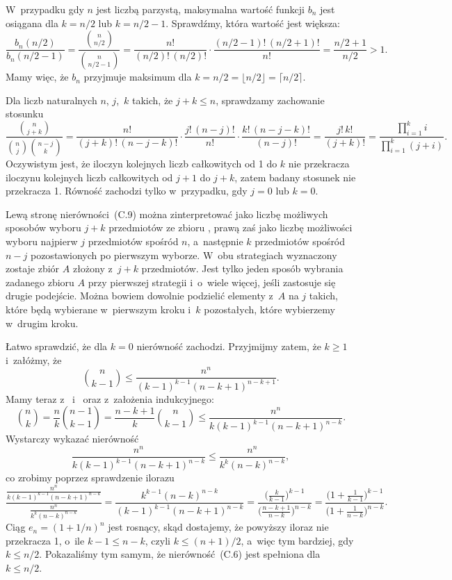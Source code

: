 W~przypadku gdy $n$ jest liczbą parzystą, maksymalna wartość funkcji $b_n$ jest osiągana dla $k=n/2$ lub $k=n/2-1$. Sprawdźmy, która wartość jest większa:
\[
    \frac{b_n(n/2)}{b_n(n/2-1)} = \frac{\binom{n}{n/2}}{\binom{n}{n/2-1}} = \frac{n!}{(n/2)!\,(n/2)!}\cdot\frac{(n/2-1)!\,(n/2+1)!}{n!} = \frac{n/2+1}{n/2} > 1.
\]
Mamy więc, że $b_n$ przyjmuje maksimum dla $k=n/2=\lfloor n/2\rfloor=\lceil n/2\rceil$.

\exercise %
Dla liczb naturalnych $n$, $j$,~$k$ takich, że $j+k\le n$, sprawdzamy zachowanie stosunku
\[
	\frac{\binom{n}{j+k}}{\binom{n}{j}\binom{n-j}{k}} = \frac{n!}{(j+k)!\,(n-j-k)!}\cdot\frac{j!\,(n-j)!}{n!}\cdot\frac{k!\,(n-j-k)!}{(n-j)!} = \frac{j!\,k!}{(j+k)!} = \frac{\prod_{i=1}^ki}{\prod_{i=1}^k(j+i)}.
\]
Oczywistym jest, że iloczyn kolejnych liczb całkowitych od 1 do $k$ nie przekracza iloczynu kolejnych liczb całkowitych od $j+1$ do $j+k$, zatem badany stosunek nie przekracza 1. Równość zachodzi tylko w~przypadku, gdy $j=0$ lub $k=0$.

Lewą stronę nierówności~(C.9) można zinterpretować jako liczbę możliwych sposobów wyboru $j+k$ przedmiotów ze zbioru , prawą zaś jako liczbę możliwości wyboru najpierw $j$ przedmiotów spośród $n$, a~następnie $k$ przedmiotów spośród $n-j$ pozostawionych po pierwszym wyborze. W~obu strategiach wyznaczony zostaje zbiór $A$ złożony z~$j+k$ przedmiotów. Jest tylko jeden sposób wybrania zadanego zbioru $A$ przy pierwszej strategii i~o~wiele więcej, jeśli zastosuje się drugie podejście. Można bowiem dowolnie podzielić elementy z~$A$ na $j$ takich, które będą wybierane w~pierwszym kroku i~$k$ pozostałych, które wybierzemy w~drugim kroku.

\exercise %
Łatwo sprawdzić, że dla $k=0$ nierówność zachodzi. Przyjmijmy zatem, że $k\ge1$ i~załóżmy, że
\[
	\binom{n}{k-1} \le \frac{n^n}{(k-1)^{k-1}(n-k+1)^{n-k+1}}.
\]
Mamy teraz z~ i~ oraz z~założenia indukcyjnego:
\[
	\binom{n}{k} = \frac{n}{k}\binom{n-1}{k-1} = \frac{n-k+1}{k}\binom{n}{k-1} \le \frac{n^n}{k(k-1)^{k-1}(n-k+1)^{n-k}}.
\]
Wystarczy wykazać nierówność
\[
	\frac{n^n}{k(k-1)^{k-1}(n-k+1)^{n-k}} \le \frac{n^n}{k^k(n-k)^{n-k}},
\]
co zrobimy poprzez sprawdzenie ilorazu
\[
	\frac{\frac{n^n}{k(k-1)^{k-1}(n-k+1)^{n-k}}}{\frac{n^n}{k^k(n-k)^{n-k}}} = \frac{k^{k-1}(n-k)^{n-k}}{(k-1)^{k-1}(n-k+1)^{n-k}} = \frac{\bigl(\frac{k}{k-1}\bigr)^{k-1}}{\bigl(\frac{n-k+1}{n-k}\bigr)^{n-k}} = \frac{\bigl(1+\frac{1}{k-1}\bigr)^{k-1}}{\bigl(1+\frac{1}{n-k}\bigr)^{n-k}}.
\]
Ciąg $e_n={(1+1/n)}^n$ jest rosnący, skąd dostajemy, że powyższy iloraz nie przekracza 1, o~ile $k-1\le n-k$, czyli $k\le(n+1)/2$, a~więc tym bardziej, gdy $k\le n/2$. Pokazaliśmy tym samym, że nierówność~(C.6) jest spełniona dla $k\le n/2$.

